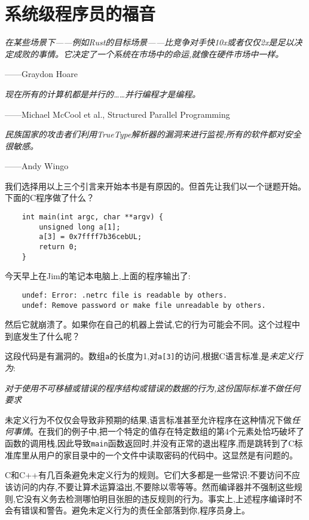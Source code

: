 \chapter{系统级程序员的福音}\label{ch01}
\emph{在某些场景下——例如Rust的目标场景——比竞争对手快10x或者仅仅2x是足以决定成败的事情。它决定了一个系统在市场中的命运,就像在硬件市场中一样。}
\begin{flushright}
    ——Graydon Hoare
\end{flushright}

\emph{现在所有的计算机都是并行的……并行编程才是编程。}
\begin{flushright}
    ——Michael McCool et al., Structured Parallel Programming    
\end{flushright}

\emph{民族国家的攻击者们利用TrueType解析器的漏洞来进行监视;所有的软件都对安全很敏感。}
\begin{flushright}
    ——Andy Wingo
\end{flushright}

我们选择用以上三个引言来开始本书是有原因的。但首先让我们以一个谜题开始。下面的C程序做了什么？
\begin{verbatim}
    int main(int argc, char **argv) {
        unsigned long a[1];
        a[3] = 0x7ffff7b36cebUL;
        return 0;
    }
\end{verbatim}

今天早上在Jim的笔记本电脑上,上面的程序输出了:
\begin{verbatim}
    undef: Error: .netrc file is readable by others.
    undef: Remove password or make file unreadable by others.
\end{verbatim}
然后它就崩溃了。如果你在自己的机器上尝试,它的行为可能会不同。这个过程中到底发生了什么呢？

这段代码是有漏洞的。数组\texttt{a}的长度为1,对\texttt{a[3]}的访问,根据C语言标准,是\emph{未定义行为}:

\emph{对于使用不可移植或错误的程序结构或错误的数据的行为,这份国际标准不做任何要求}

未定义行为不仅仅会导致非预期的结果,语言标准甚至允许程序在这种情况下做\emph{任何事情}。在我们的例子中,把一个特定的值存在特定数组的第4个元素处恰巧破坏了函数的调用栈,因此导致\texttt{main}函数返回时,并没有正常的退出程序,而是跳转到了C标准库里从用户的家目录中的一个文件中读取密码的代码中。这显然是有问题的。

C和C++有几百条避免未定义行为的规则。它们大多都是一些常识:不要访问不应该访问的内存,不要让算术运算溢出,不要除以零等等。然而编译器并不强制这些规则,它没有义务去检测哪怕明目张胆的违反规则的行为。事实上,上述程序编译时不会有错误和警告。避免未定义行为的责任全部落到你,程序员身上。

